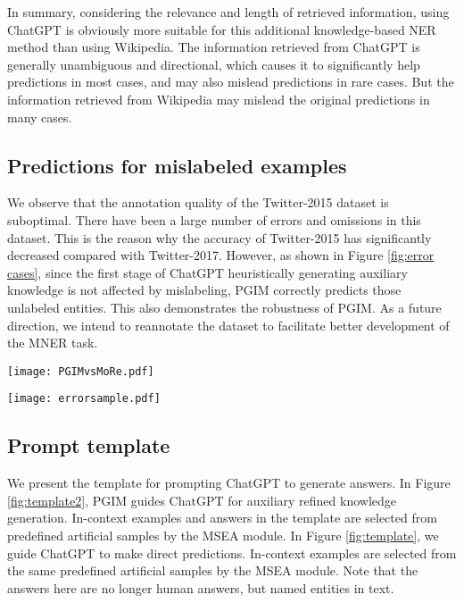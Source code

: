 \documentclass[11pt]{article}
\begin{document}
In summary, considering the relevance and length of retrieved information, using ChatGPT is obviously more suitable for this additional knowledge-based NER method than using Wikipedia. 
The information retrieved from ChatGPT is generally unambiguous and directional, which causes it to significantly help predictions in most cases, and may also mislead predictions in rare cases. But the information retrieved from Wikipedia may mislead the original predictions in many cases.


\subsection{Predictions for mislabeled examples}
\label{misableled}
We observe that the annotation quality of the Twitter-2015 dataset is suboptimal. There have been a large number of errors and omissions in this dataset. This is the reason why the accuracy of Twitter-2015 has significantly decreased compared with Twitter-2017. However, as shown in Figure \ref{fig:error cases},  since the first stage of ChatGPT heuristically generating auxiliary knowledge is not affected by mislabeling, PGIM correctly predicts those unlabeled entities. This also demonstrates the robustness of PGIM. 
As a future direction, we intend to reannotate the dataset to facilitate better development of the MNER task. 

\begin{figure*}
	\centering
	\texttt{[image: PGIMvsMoRe.pdf]}
	\caption{Two case studies on how information retrieved from Wikipedia by MoRe and information retrieved by PGIM from ChatGPT affects model predictions.}
	\label{fig:PGIM vs MoRe}
\end{figure*}

\begin{figure*}
	\centering
	\texttt{[image: errorsample.pdf]}
	\caption{Some mislabeled examples of Twitter-2015 datasets. }
	\label{fig:error cases}
\end{figure*}

\subsection{Prompt template}
\label{templatephoto}
We present the template for prompting ChatGPT to generate answers. 
In Figure \ref{fig:template2}, PGIM guides ChatGPT for auxiliary refined knowledge generation. In-context examples and answers in the template are selected from predefined artificial samples by the MSEA module. 
In Figure \ref{fig:template}, we guide ChatGPT to make direct predictions. 
In-context examples are selected from the same predefined artificial samples by the MSEA module. Note that the answers here are no longer human answers, but named entities in text. 
\end{document}
